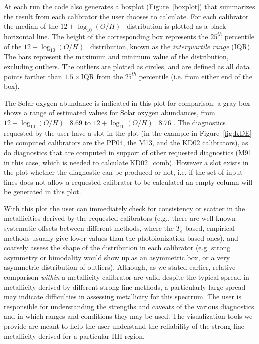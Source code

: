 \documentclass{emulateapj} \usepackage{amsmath} \usepackage{float}
\newcommand{\oxabinline}{\ensuremath{12 + \log_{10}(O/H)}}
\begin{document}
At each run the code also generates a boxplot (Figure~\ref{boxplot})
that summarizes the result from each calibrator the user chooses to
calculate. For each calibrator the median of the \oxabinline~
distribution is plotted as a black horizontal line. The height of the
corresponding box represents the $25^{th}$ percentile of the
\oxabinline~ distribution, known as the \emph{interquartile range}
(IQR).  The bars represent the maximum and minimum value of the
distribution, excluding outliers. The outliers are plotted as circles,
and are defined as all data points farther than
$1.5\times\mathrm{IQR}$ from the $25^{th}$ percentile (i.e. from
either end of the box).

The Solar oxygen abundance is indicated in this plot for comparison: a
gray box shows a range of estimated values for Solar oxygen
abundances, from \oxabinline=8.69 \citep{asplund09_rev} to
\oxabinline=8.76 \citep{chaffau11}.  The diagnostics requested by the
user have a slot in the plot (in the example in Figure~\ref{fig:KDE}
the computed calibrators are the PP04, the M13, and the KD02
calibrators), as do diagnostics that are computed in support of other
requested diagnostics (M91 in this case, which is needed to calculate
KD02\_comb). However a slot exists in the plot whether the diagnostic
can be produced or not, i.e. if the set of input lines does not allow
a requested calibrator to be calculated an empty column will be
generated in this plot.

With this plot the user can immediately check for consistency or
scatter in the metallicities derived by the requested calibrators
(e.g., there are well-known systematic offsets between different
methods, where the $T_e$-based, empirical methods usually give lower
values than the photoionization based ones), and coarsely assess the
shape of the distribution in each calibrator (e.g. strong asymmetry or
bimodality would show up as an asymmetric box, or a very asymmetric
distribution of outliers). Although, as we stated earlier, relative
comparison \emph{within} a metallicity calibrator are valid despite
the typical spread in metallicity derived by different strong line
methods, a particularly large spread may indicate difficulties in
assessing metallicity for this spectrum. The user is responsible for
understanding the strengths and caveats of the various diagnostics and
in which ranges and conditions they may be used. The visualization
tools we provide are meant to help the user understand the reliability
of the strong-line metallicity derived for a particular HII region.
\end{document}
